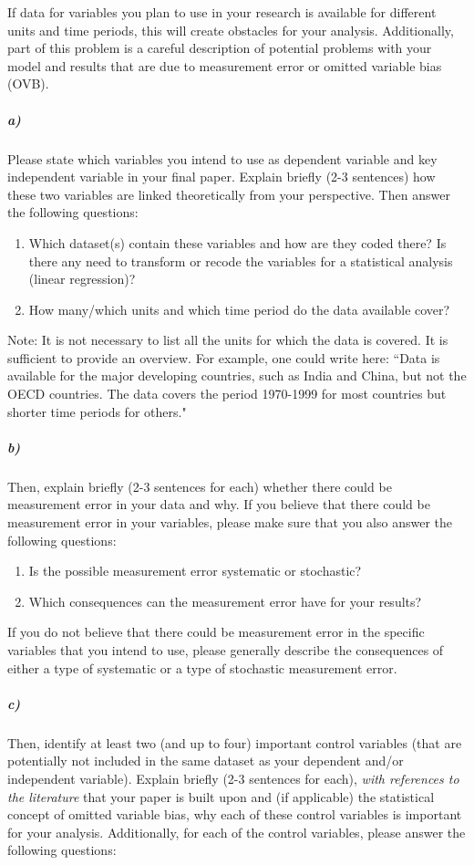 \documentclass[12pt]{article}
\begin{document}
If data for variables you plan to use in your research is available for different units and time periods, this will create obstacles for your analysis. Additionally, part of this problem is a careful description of potential problems with your model and results that are due to measurement error or omitted variable bias (OVB).

\subparagraph{a)} Please state which variables you intend to use as dependent variable and key independent variable in your final paper. Explain briefly (2-3 sentences) how these two variables are linked theoretically from your perspective. Then answer the following questions:

\begin{enumerate}
	\item Which dataset(s) contain these variables and how are they coded there? Is there any need to transform or recode the variables for a statistical analysis (linear regression)?
	\item How many/which units and which time period do the data available cover?
\end{enumerate}

Note: It is not necessary to list all the units for which the data is covered. It is sufficient to provide an overview. For example, one could write here: ``Data is available for the major developing countries, such as India and China, but not the OECD countries. The data covers the period 1970-1999 for most countries but shorter time periods for others."

\subparagraph{b)} Then, explain briefly (2-3 sentences for each) whether there could be measurement error in your data and why. If you believe that there could be measurement error in your variables, please make sure that you also answer the following questions:

\begin{enumerate}
	\item Is the possible measurement error systematic or stochastic?
	\item Which consequences can the measurement error have for your results?
\end{enumerate}

If you do not believe that there could be measurement error in the specific variables that you intend to use, please generally describe the consequences of either a type of systematic or a type of stochastic measurement error.

\subparagraph{c)} Then, identify at least two (and up to four) important control variables (that are potentially not included in the same dataset as your dependent and/or independent variable). Explain briefly (2-3 sentences for each), \textit{with references to the literature} that your paper is built upon and (if applicable) the statistical concept of omitted variable bias, why each of these control variables is important for your analysis. Additionally, for each of the control variables, please answer the following questions:
\end{document}
